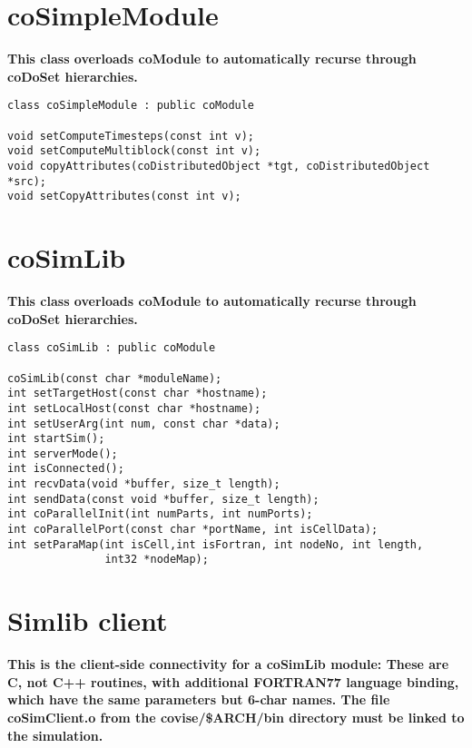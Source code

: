 \section{coSimpleModule}

{\bf This class overloads coModule to automatically recurse through 
coDoSet hierarchies.}

\begin{verbatim}
class coSimpleModule : public coModule

void setComputeTimesteps(const int v); 
void setComputeMultiblock(const int v); 
void copyAttributes(coDistributedObject *tgt, coDistributedObject *src); 
void setCopyAttributes(const int v);
\end{verbatim}
 

\section{coSimLib}

{\bf This class overloads coModule to automatically recurse through coDoSet 
hierarchies.}

\begin{verbatim}
class coSimLib : public coModule

coSimLib(const char *moduleName);
int setTargetHost(const char *hostname);
int setLocalHost(const char *hostname);
int setUserArg(int num, const char *data);
int startSim();
int serverMode();
int isConnected();
int recvData(void *buffer, size_t length);  
int sendData(const void *buffer, size_t length);
int coParallelInit(int numParts, int numPorts);
int coParallelPort(const char *portName, int isCellData);
int setParaMap(int isCell,int isFortran, int nodeNo, int length, 
               int32 *nodeMap);
\end{verbatim}


\section{Simlib client}

{\bf This is the client-side connectivity for a coSimLib module: These are 
C, not C++ routines, with additional FORTRAN77 language binding, which have
the same parameters but 6-char names. The file coSimClient.o from the 
covise/\$ARCH/bin  directory must be linked to the simulation.}


